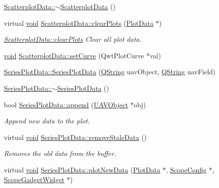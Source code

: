 \begin{DoxyCompactItemize}
\item 
\hyperlink{group___scope_plugin_gacbf85488507f5abc08a2e018fe01c6aa}{\-Scatterplot\-Data\-::$\sim$\-Scatterplot\-Data} ()
\item 
virtual \hyperlink{group___u_a_v_objects_plugin_ga444cf2ff3f0ecbe028adce838d373f5c}{void} \hyperlink{group___scope_plugin_gaa7f91ef4cdbbbdc7e767c24bfea06159}{\-Scatterplot\-Data\-::clear\-Plots} (\hyperlink{class_plot_data}{\-Plot\-Data} $\ast$)
\begin{DoxyCompactList}\small\item\em \hyperlink{group___scope_plugin_gaa7f91ef4cdbbbdc7e767c24bfea06159}{\-Scatterplot\-Data\-::clear\-Plots} \-Clear all plot data. \end{DoxyCompactList}\item 
\hyperlink{group___u_a_v_objects_plugin_ga444cf2ff3f0ecbe028adce838d373f5c}{void} \hyperlink{group___scope_plugin_gac306ab453dd4daa43ebd0565b7f73783}{\-Scatterplot\-Data\-::set\-Curve} (\-Qwt\-Plot\-Curve $\ast$val)
\item 
\hyperlink{group___scope_plugin_ga82d1767158aa15b3c4306bc74960692e}{\-Series\-Plot\-Data\-::\-Series\-Plot\-Data} (\hyperlink{group___u_a_v_objects_plugin_gab9d252f49c333c94a72f97ce3105a32d}{\-Q\-String} uav\-Object, \hyperlink{group___u_a_v_objects_plugin_gab9d252f49c333c94a72f97ce3105a32d}{\-Q\-String} uav\-Field)
\item 
\hyperlink{group___scope_plugin_gae281a484eece3ddc571d397e576bad97}{\-Series\-Plot\-Data\-::$\sim$\-Series\-Plot\-Data} ()
\item 
bool \hyperlink{group___scope_plugin_ga3f88889724489ec42f8bc0544a3f4474}{\-Series\-Plot\-Data\-::append} (\hyperlink{class_u_a_v_object}{\-U\-A\-V\-Object} $\ast$obj)
\begin{DoxyCompactList}\small\item\em \-Append new data to the plot. \end{DoxyCompactList}\item 
virtual \hyperlink{group___u_a_v_objects_plugin_ga444cf2ff3f0ecbe028adce838d373f5c}{void} \hyperlink{group___scope_plugin_gad07a97346395d3ee7ee2d455a6d863d1}{\-Series\-Plot\-Data\-::remove\-Stale\-Data} ()
\begin{DoxyCompactList}\small\item\em \-Removes the old data from the buffer. \end{DoxyCompactList}\item 
virtual \hyperlink{group___u_a_v_objects_plugin_ga444cf2ff3f0ecbe028adce838d373f5c}{void} \hyperlink{group___scope_plugin_ga9a0a0e2cd48eeba6f77d3da8421729c4}{\-Series\-Plot\-Data\-::plot\-New\-Data} (\hyperlink{class_plot_data}{\-Plot\-Data} $\ast$, \hyperlink{class_scope_config}{\-Scope\-Config} $\ast$, \hyperlink{class_scope_gadget_widget}{\-Scope\-Gadget\-Widget} $\ast$)

\end{DoxyCompactItemize}
